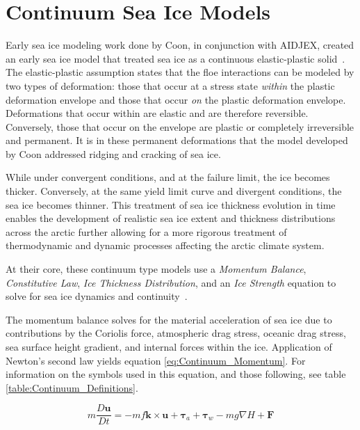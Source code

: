\section{Continuum Sea Ice Models}\label{sec:Intro_Continuum}
Early sea ice modeling work done by Coon, in conjunction with \ac{AIDJEX}, created an early sea ice model that treated sea ice as a continuous elastic-plastic solid~\citet{Coon}.  The elastic-plastic assumption states that the floe interactions can be modeled by two types of deformation: those that occur at a stress state \textit{within} the plastic deformation envelope and those that occur \textit{on} the plastic deformation envelope.  Deformations that occur within are elastic and are therefore reversible.  Conversely, those that occur on the envelope are plastic or completely irreversible and permanent.  It is in these permanent deformations that the model developed by Coon addressed ridging and cracking of sea ice.

While under convergent conditions, and at the failure limit, the ice becomes thicker.  Conversely, at the same yield limit curve and divergent conditions, the sea ice becomes thinner.  This treatment of sea ice thickness evolution in time enables the development of realistic sea ice extent and thickness distributions across the arctic further allowing for a more rigorous treatment of thermodynamic and dynamic processes affecting the arctic climate system.

At their core, these continuum type models use a \textit{Momentum Balance}, \textit{Constitutive Law}, \textit{Ice Thickness Distribution}, and an \textit{Ice Strength} equation to solve for sea ice  dynamics and continuity~\citet{Hibler1979}.

The momentum balance solves for the material acceleration of sea ice due to contributions by the Coriolis force, atmospheric drag stress, oceanic drag stress, sea surface height gradient, and internal forces within the ice.  Application of Newton's second law yields equation \ref{eq:Continuum_Momentum}.  For information on the symbols used in this equation, and those following, see table \ref{table:Continuum_Definitions}.

\begin{equation}
m\frac{D\mathbf{u}}{Dt}= -mf\mathbf{k}\times\mathbf{u} + \boldsymbol{\tau}_a + \boldsymbol{\tau}_w - mg\nabla H + \mathbf{F}
\label{eq:Continuum_Momentum}
\end{equation}

